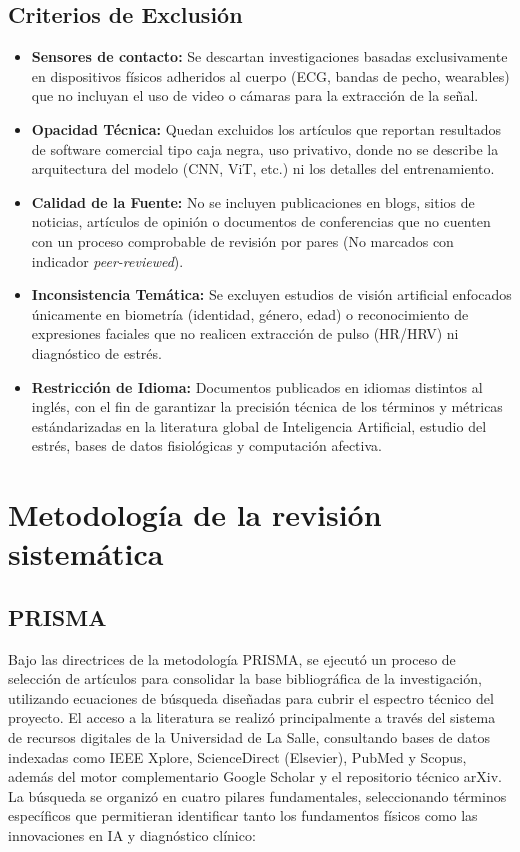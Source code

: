 \subsection{Criterios de Exclusión}
\begin{itemize}
    \item \textbf{Sensores de contacto:} Se descartan investigaciones basadas exclusivamente en dispositivos físicos adheridos al cuerpo 
    (ECG, bandas de pecho, wearables) que no incluyan el uso de video o cámaras para la extracción de la señal.
    \item \textbf{Opacidad Técnica:} Quedan excluidos los artículos que reportan resultados de software comercial tipo caja negra, uso privativo, donde no se describe la 
    arquitectura del modelo (CNN, ViT, etc.) ni los detalles del entrenamiento.
    \item \textbf{Calidad de la Fuente:} No se incluyen publicaciones en blogs, sitios de noticias, artículos de opinión o documentos de conferencias que no 
    cuenten con un proceso comprobable de revisión por pares (No marcados con indicador \textit{peer-reviewed}).
    \item \textbf{Inconsistencia Temática:} Se excluyen estudios de visión artificial enfocados únicamente en biometría (identidad, género, edad) o 
    reconocimiento de expresiones faciales que no realicen extracción de pulso (HR/HRV) ni diagnóstico de estrés.
    \item \textbf{Restricción de Idioma:} Documentos publicados en idiomas distintos al inglés, con el fin de garantizar la precisión técnica de los términos y 
    métricas estándarizadas en la literatura global de Inteligencia Artificial, estudio del estrés, bases de datos fisiológicas y computación afectiva.
\end{itemize}

\section{Metodología de la revisión sistemática}

\subsection{PRISMA}
Bajo las directrices de la metodología PRISMA, se ejecutó un proceso de selección de artículos para consolidar la base bibliográfica de la investigación, 
utilizando ecuaciones de búsqueda diseñadas para cubrir el espectro técnico del proyecto. El acceso a la literatura se realizó principalmente a través del 
sistema de recursos digitales de la Universidad de La Salle, consultando bases de datos indexadas como IEEE Xplore, ScienceDirect (Elsevier), PubMed y Scopus, 
además del motor complementario Google Scholar y el repositorio técnico arXiv. La búsqueda se organizó en cuatro pilares fundamentales, seleccionando términos 
específicos que permitieran identificar tanto los fundamentos físicos como las innovaciones en IA y diagnóstico clínico:


